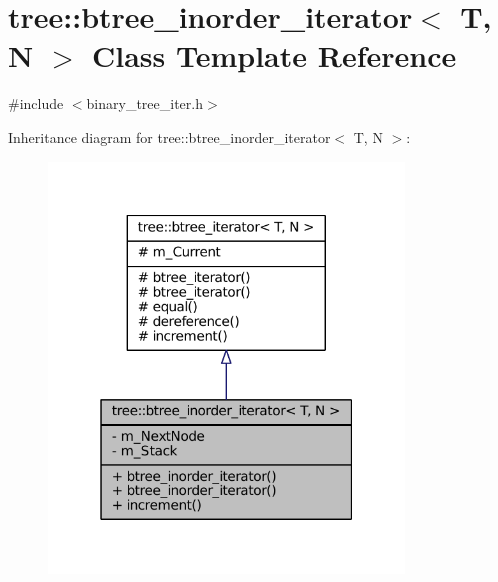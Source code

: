 \hypertarget{classtree_1_1btree__inorder__iterator}{\section{tree\-:\-:btree\-\_\-inorder\-\_\-iterator$<$ \-T, \-N $>$ \-Class \-Template \-Reference}
\label{classtree_1_1btree__inorder__iterator}
}


{\ttfamily \#include $<$binary\-\_\-tree\-\_\-iter.\-h$>$}



\-Inheritance diagram for tree\-:\-:btree\-\_\-inorder\-\_\-iterator$<$ \-T, \-N $>$\-:
\nopagebreak
\begin{figure}[H]
\begin{center}
\leavevmode
\includegraphics[width=268pt]{classtree_1_1btree__inorder__iterator__inherit__graph}
\end{center}
\end{figure}


